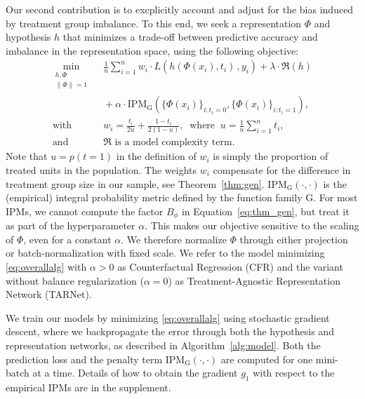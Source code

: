 \documentclass{article}
\def\cF{\mathrm{G}}
\def\tarnet{{TARNet}}
\begin{document}
Our second contribution is to excplicitly account and adjust for the bias induced by treatment group imbalance. To this end, we seek a representation $\Phi$ and hypothesis $h$ that minimizes a trade-off between predictive accuracy and imbalance in the representation space, using the following objective:
\begin{equation}
\begin{aligned}
\min_{\substack{h, \Phi\\ \|\Phi\|=1}} & \;\; \frac 1 n \sum_{i=1}^n w_i \cdot L\left(h(\Phi(x_i),t_i)\, ,y_i\right) + \lambda \cdot \mathfrak{R}(h)  \\
& \;\; + \alpha  \cdot \text{IPM}_\cF\left(\{\Phi(x_i)\}_{i:t_i=0},\{\Phi(x_i)\}_{i:t_i=1}\right), \\
\mbox{with} & \;\; w_i = \frac{t_i}{2u} + \frac{1-t_i}{2(1-u)},\;\;\mbox{where}\;\;u = \frac{1}{n}\sum_{i=1}^n t_i, \\
\mbox{and} & \;\;\mbox{$\mathfrak{R}$ is a model complexity term.}
\label{eq:overallalg}
\end{aligned}
\end{equation}
Note that $u=p(t=1)$ in the definition of $w_i$ is simply the proportion of treated units in the population. The weights $w_i$ compensate for the difference in treatment group size in our sample, see Theorem~\ref{thm:gen}. $\text{IPM}_{\cF}(\cdot,\cdot)$ is the (empirical) integral probability metric defined by the function family $\cF$. For most IPMs, we cannot compute the factor $B_\phi$ in Equation~\ref{eq:thm_gen}, but treat it as part of the hyperparameter $\alpha$. This makes our objective sensitive to the scaling of $\Phi$, even for a constant $\alpha$. We therefore normalize $\Phi$ through either projection or batch-normalization with fixed scale. We refer to the model minimizing \eqref{eq:overallalg} with $\alpha>0$ as Counterfactual Regression (CFR) and the variant without balance regularization ($\alpha=0$) as Treatment-Agnostic Representation Network (\tarnet{}).

We train our models by minimizing \eqref{eq:overallalg} using stochastic gradient descent, where we backpropagate the error through both the hypothesis and representation networks, as described in Algorithm~\ref{alg:model}. Both the prediction loss and the penalty term $\text{IPM}_{\cF}(\cdot,\cdot)$ are computed for one mini-batch at a time. Details of how to obtain the gradient $g_1$ with respect to the empirical IPMs are in the supplement.
\end{document}
